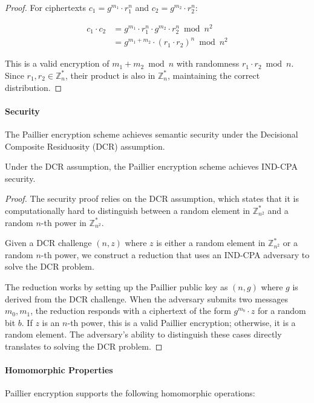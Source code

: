 \begin{proof}
For ciphertexts $c_1 = g^{m_1} \cdot r_1^n$ and $c_2 = g^{m_2} \cdot r_2^n$:

\begin{align*}
c_1 \cdot c_2 &= g^{m_1} \cdot r_1^n \cdot g^{m_2} \cdot r_2^n \bmod n^2 \\
&= g^{m_1+m_2} \cdot (r_1 \cdot r_2)^n \bmod n^2
\end{align*}

This is a valid encryption of $m_1 + m_2 \bmod n$ with randomness $r_1 \cdot r_2 \bmod n$. Since $r_1, r_2 \in \mathbb{Z}_n^*$, their product is also in $\mathbb{Z}_n^*$, maintaining the correct distribution.
\end{proof}

\paragraph{Security}
The Paillier encryption scheme achieves semantic security under the Decisional Composite Residuosity (DCR) assumption.

\begin{thm}
Under the DCR assumption, the Paillier encryption scheme achieves IND-CPA security.
\end{thm}

\begin{proof}
The security proof relies on the DCR assumption, which states that it is computationally hard to distinguish between a random element in $\mathbb{Z}_{n^2}^*$ and a random $n$-th power in $\mathbb{Z}_{n^2}^*$.

Given a DCR challenge $(n, z)$ where $z$ is either a random element in $\mathbb{Z}_{n^2}^*$ or a random $n$-th power, we construct a reduction that uses an IND-CPA adversary to solve the DCR problem.

The reduction works by setting up the Paillier public key as $(n, g)$ where $g$ is derived from the DCR challenge. When the adversary submits two messages $m_0, m_1$, the reduction responds with a ciphertext of the form $g^{m_b} \cdot z$ for a random bit $b$. If $z$ is an $n$-th power, this is a valid Paillier encryption; otherwise, it is a random element. The adversary's ability to distinguish these cases directly translates to solving the DCR problem.
\end{proof}

\paragraph{Homomorphic Properties}
Paillier encryption supports the following homomorphic operations:

